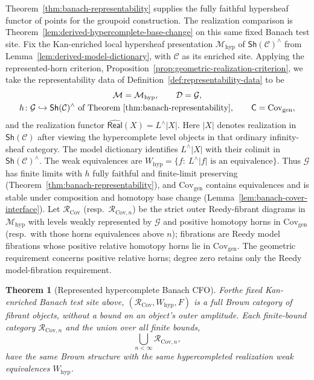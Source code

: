 \documentclass[12pt]{amsart}
\newtheorem{thm}{Theorem}[section]
\theoremstyle{definition}
\theoremstyle{remark}
\numberwithin{equation}{section}
\newcommand{\CM}{\mathcal M}
\newcommand{\Sh}{\mathsf{Sh}}
\begin{document}
Theorem~\ref{thm:banach-representability} supplies
the fully faithful hypersheaf functor of points
for the groupoid construction.
The realization comparison is
Theorem~\ref{lem:derived-hypercomplete-base-change}
on this same fixed Banach test site.
Fix the
Kan-enriched local hypersheaf presentation
$\CM_{\mathrm{hyp}}$ of $\Sh(\mathcal C)^{\wedge}$ from
Lemma~\ref{lem:derived-model-dictionary}, with $\mathcal C$ as its
enriched site. Applying the represented-horn criterion,
Proposition~\ref{prop:geometric-realization-criterion}, we take the
representability data of
Definition~\ref{def:representability-data} to be
\[
 \begin{gathered}
 \CM=\CM_{\mathrm{hyp}},\qquad
 \mathcal D=\mathcal G,\\
 h\colon\mathcal G\hookrightarrow\Sh(\mathcal C)^{\wedge}
 \ \text{of Theorem~\ref{thm:banach-representability}},\qquad
 \mathsf C=\mathrm{Cov}_{\mathrm{gen}},
 \end{gathered}
\]
and the realization functor
$\widehat{\mathsf{Real}}(X)=L^{\wedge}|X|$. Here $|X|$ denotes
realization in $\Sh(\mathcal C)$ after viewing the hypercomplete
level objects in that ordinary infinity-sheaf category. The
model dictionary identifies $L^{\wedge}|X|$ with their colimit
in $\Sh(\mathcal C)^\wedge$. The weak equivalences are
$W_{\mathrm{hyp}}=\{f:\ L^{\wedge}|f|\text{ is an equivalence}\}$.
Thus $\mathcal G$ has finite limits with $h$ fully faithful and
finite-limit preserving
(Theorem~\ref{thm:banach-representability}),
and $\mathrm{Cov}_{\mathrm{gen}}$ contains equivalences and is stable
under composition and homotopy base change
(Lemma~\ref{lem:banach-cover-interface}). Let
$\mathscr R_{\mathrm{Cov}}$ (resp.\ $\mathscr R_{\mathrm{Cov},n}$)
be the strict outer Reedy-fibrant diagrams in $\CM_{\mathrm{hyp}}$
with levels weakly represented by $\mathcal G$ and positive
homotopy horns in $\mathrm{Cov}_{\mathrm{gen}}$ (resp.\ with those
horns equivalences above $n$); fibrations are Reedy model fibrations
whose positive relative homotopy horns lie in
$\mathrm{Cov}_{\mathrm{gen}}$. The geometric requirement concerns
positive relative horns; degree zero retains only the Reedy
model-fibration requirement.

\begin{thm}[Represented hypercomplete Banach CFO]
For\label{thm:banach-cfo} the fixed Kan-enriched Banach test site above,
$(\mathscr R_{\mathrm{Cov}},W_{\mathrm{hyp}},F)$
is a full Brown category of fibrant objects, without
a bound on an object's outer amplitude.
Each finite-bound category
$\mathscr R_{\mathrm{Cov},n}$ and the union over all
finite bounds,
\[
 \bigcup_{n<\infty}\mathscr R_{\mathrm{Cov},n},
\]
have the same Brown structure with the same
hypercompleted realization weak equivalences
$W_{\mathrm{hyp}}$.
\end{thm}
\end{document}
